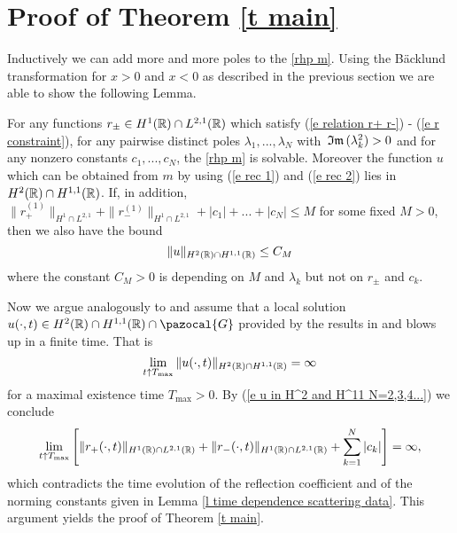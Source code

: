 \section{Proof of Theorem \ref{t main} }\label{s proof}
Inductively we can add more and more poles to the \rh \ref{rhp m}. Using the B\"{a}cklund transformation for $x>0$ and $x<0$ as described in the previous section we are able to show the following Lemma.
\begin{lem}\label{l solvability of RHP N geq 2}
    For any functions $r_{\pm}\in H^1(\mathbb R)\cap L^{2,1}(\mathbb R)$ which satisfy (\ref{e relation r+ r-}) - (\ref{e r constraint}), for any pairwise distinct poles $\lambda_1,...,\lambda_N$ with $\,\mathfrak{Im}\,(\lambda_k^2)>0$ and for any nonzero constants $c_1,...,c_N$, the \rh \ref{rhp m} is solvable. Moreover the function $u$ which can be obtained from $m$ by using (\ref{e rec 1}) and (\ref{e rec 2}) lies in $H^2(\mathbb R)\cap H^{1,1}(\mathbb R)$. If, in addition, $\|r^{(1)}_+\|_{H^1\cap L^{2,1}}+\|r^{(1)}_-\|_{H^1\cap L^{2,1}}+|c_1|+...+|c_N|\leq M$ for some fixed $M>0$, then we also have the bound
    \begin{equation}\label{e u in H^2 and H^11 N=2,3,4...}
        \|u\|_{H^2(\mathbb R)\cap H^{1,1}(\mathbb R)}\leq C_M
    \end{equation}
    where the constant $C_M>0$ is depending on $M$ and $\lambda_k$ but not on $r_{\pm}$ and $c_k$.
\end{lem}
Now we argue analogously to \cite{Pelinovsky2016} and assume that a local solution $u(\cdot,t)\in H^2(\Real)\cap H^{1,1}(\Real)\cap\pazocal{G}$ provided by the results in \cite{Tsutsumi1980} and \cite{Hayashi1992} blows up in a finite time. That is
$$
\lim_{t\uparrow T_{\text{max}}}\|u(\cdot,t)\|_{H^2(\mathbb R)\cap H^{1,1}(\mathbb R)}=\infty
$$
for a maximal existence time $T_{\text{max}}>0$. By (\ref{e u in H^2 and H^11 N=2,3,4...}) we conclude
$$
\lim_{t\uparrow T_{\text{max}}}\left[\|r_{+}(\cdot,t)\|_{H^1(\mathbb R)\cap L^{2,1}(\mathbb R)}+\|r_{-}(\cdot,t)\|_{H^1(\mathbb R)\cap L^{2,1}(\mathbb R)}+\sum_{k=1}^N|c_k|\right]=\infty,
$$
which contradicts the time evolution of the reflection coefficient and of the norming constants given in Lemma \ref{l time dependence scattering data}. This argument yields the proof of Theorem \ref{t main}.
